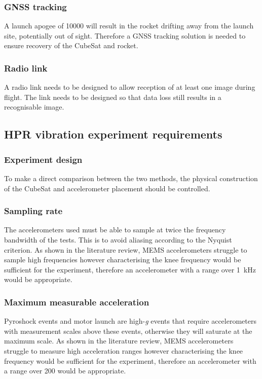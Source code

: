\documentclass{report}
\begin{document}
\subsubsection{GNSS tracking}
A launch apogee of \SI{10000}{\feet} will result in the rocket drifting away from the launch site, potentially out of sight. Therefore a GNSS tracking solution is needed to ensure recovery of the CubeSat and rocket.

\subsubsection{Radio link}
A radio link needs to be designed to allow reception of at least one image during flight. The link needs to be designed so that data loss still results in a recognisable image.

\subsection{HPR vibration experiment requirements}

\subsubsection{Experiment design} To make a direct comparison between the two methods, the physical construction of the CubeSat and accelerometer placement should be controlled.

\subsubsection{Sampling rate} The accelerometers used must be able to sample at twice the frequency bandwidth of the tests. This is to avoid aliasing according to the Nyquist criterion. As shown in the literature review, MEMS accelerometers struggle to sample high frequencies however characterising the knee frequency would be sufficient for the experiment, therefore an accelerometer with a range over \SI{1}{\kilo\hertz} would be appropriate.

\subsubsection{Maximum measurable acceleration} Pyroshock events and motor launch are high-\textit{g} events that require accelerometers with measurement scales above these events, otherwise they will saturate at the maximum scale.
As shown in the literature review, MEMS accelerometers struggle to measure high acceleration ranges however characterising the knee frequency would be sufficient for the experiment, therefore an accelerometer with a range over \SI{200}{\gacc} would be appropriate.
\end{document}
